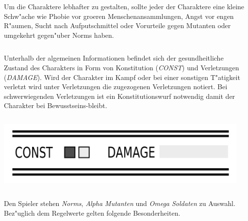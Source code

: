 Um die Charaktere lebhafter zu gestalten, sollte jeder der Charaktere eine kleine Schw"ache wie Phobie vor gro\3eren Menschenansammlungen, Angst vor engen R"aumen, Sucht nach Aufputschmittel oder Vorurteile gegen Mutanten oder umgekehrt gegen"uber Norms haben.

\begin{column}[l]{0.52}
    Unterhalb der algemeinen Informationen befindet sich der gesundheitliche Zustand des Charakters in Form von Konstitution (\emph{CONST}) und Verletzungen (\emph{DAMAGE}). Wird der Charakter im Kampf oder bei einer sonstigen T"atigkeit verletzt wird unter Verletzungen die zugezogenen Verletzungen notiert. Bei schwerwiegenden Verletzungen ist ein Konstitutionswurf notwendig damit der Charakter bei Bewusstseins-bleibt.
\end{column}
\begin{column}[r]{0.48}
    \centering
    \includegraphics[width=0.95\textwidth]{images/character_const_damage}    
\end{column}    
  


Den Spieler stehen \emph{Norms}, \emph{Alpha Mutanten} und \emph{Omega Soldaten} zu Auswahl. Bez"uglich dem Regelwerte gelten folgende Besonderheiten.

